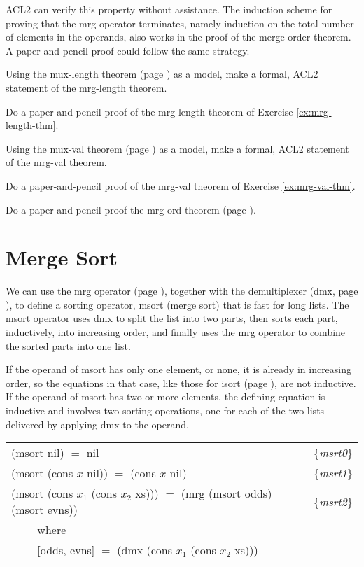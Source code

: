 ACL2 can verify this property without assistance.
The induction scheme for proving that
the \textsf{mrg} operator terminates,
namely induction on the total number of elements in the operands,
also works in the proof of the merge order theorem.
A paper-and-pencil proof could follow the same strategy.

\begin{ExerciseList}
\Exercise
\label{ex:mrg-length-thm}
Using the mux-length theorem (page \pageref{mux-length-thm})
as a model, make a formal, ACL2 statement of the mrg-length theorem.

\Exercise
Do a paper-and-pencil proof of the mrg-length theorem
of Exercise \ref{ex:mrg-length-thm}.

\Exercise
\label{ex:mrg-val-thm}
Using the mux-val theorem (page \pageref{thm:mux-val})
as a model, make a formal, ACL2 statement of the mrg-val theorem.

\Exercise
Do a paper-and-pencil proof of the mrg-val theorem of Exercise \ref{ex:mrg-val-thm}.

\Exercise
Do a paper-and-pencil proof the mrg-ord theorem (page \pageref{defthm:mrg-ord}).
\end{ExerciseList}

\section{Merge Sort}
\label{sec:msort}

We can use the \textsf{mrg} operator (page \pageref{defun:mrg}),
together with the demultiplexer (\textsf{dmx}, page \pageref{dmx-defun}),
to define a sorting operator, \textsf{msort} (merge sort) that is fast for long lists.
The \textsf{msort} operator uses \textsf{dmx} to split the list into two parts,
then sorts each part, inductively, into increasing order, and finally
uses the \textsf{mrg} operator to combine the sorted parts into one list.

If the operand of \textsf{msort} has only one element, or none,
it is already in increasing order,
so the equations in that case,
like those for \textsf{isort} (page \pageref{eq:isrt0}),
are not inductive.
If the operand of \textsf{msort} has two or more elements,
the defining equation is inductive and
involves two sorting operations,
one for each of the two lists delivered by applying
\textsf{dmx} to the operand.

\begin{center}
\label{eq:msrt1}
\label{eq:msrt0}
\label{eq:msrt2}
\begin{tabular}{ll}
\textsf{(msort nil) $=$ nil}                        & \{\emph{msrt0}\} \\
\textsf{(msort (cons $x$ nil)) $=$ (cons $x$ nil)} & \{\emph{msrt1}\} \\
\textsf{(msort (cons $x_1$ (cons $x_2$ xs))) $=$ (mrg (msort odds) (msort evns))} & \{\emph{msrt2}\} \\
 ~~~~ where  & \\
 ~~~~ \textsf{[odds, evns] $=$ (dmx (cons $x_1$ (cons $x_2$ xs)))} & \\
\end{tabular}
\end{center}

